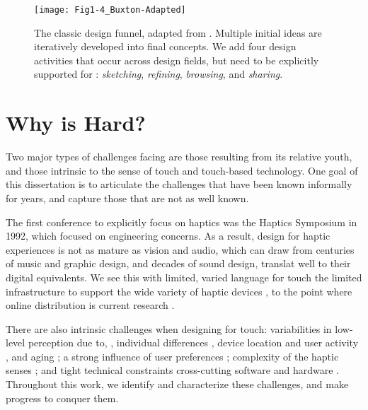 \begin{figure}[htbp] %
   \centering
   \texttt{[image: Fig1-4\_Buxton-Adapted]} 
   \caption{The classic design funnel, adapted from \citet{Buxton2007}.
   Multiple initial ideas are iteratively developed into final concepts.
   We add four design activities that occur across design fields, but need to be explicitly supported for \haxd: \textit{sketching}, \textit{refining}, \textit{browsing}, and \textit{sharing}.}
   \label{fig:intro:buxtonaugmented}
\end{figure}





\section{Why is \haxd Hard?}
Two major types of challenges facing \haxd are those resulting from its relative youth, and those intrinsic to the sense of touch and touch-based technology.
One goal of this dissertation is to articulate the challenges that have been known informally for years, and capture those that are not as well known.

The first conference to explicitly focus on haptics was the Haptics Symposium in 1992, which focused on engineering concerns.
As a result, design for haptic experiences is not as mature as  vision and audio, which can draw from centuries of music and graphic design, and decades of sound design, translat well to their digital equivalents.
We see this  with limited, varied language for touch \cite{Jansson-Boyd2011}  the limited infrastructure to support the wide variety of haptic devices \cite{Hayward2007}, to the point where online distribution is current research \cite{AbdurRahman2010}.

There are also intrinsic challenges when designing for touch:
variabilities in low-level perception due to, \eg, individual differences \cite{Lo1984}, device location and user activity \cite{Karuei2011}, and aging \cite{Stevens1996,Stevens1992};
a strong influence of user preferences \cite{Seifi2014,Seifi2015};
complexity of the haptic senses \cite{ChoiKuchenbecker2013,Lederman2009survey,Kandel2000};
and tight technical constraints cross-cutting software and hardware \cite{levitin2000perception,Hayward2007}.
Throughout this work, we identify and characterize these challenges, and make progress to conquer them.





